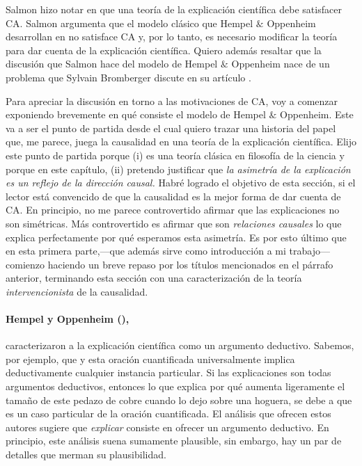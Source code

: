 Salmon hizo notar en  que una teoría
de la explicación científica debe satisfacer CA. Salmon
argumenta que el modelo clásico que Hempel $\&$ Oppenheim
desarrollan en  no satisface CA y, por
lo tanto, es necesario modificar la teoría para dar cuenta
de la explicación científica. Quiero además resaltar que la
discusión que Salmon hace del modelo de Hempel $\&$
Oppenheim nace de un problema que  Sylvain Bromberger
discute en su artículo .

Para apreciar la discusión en torno a las motivaciones de
CA, voy a comenzar exponiendo brevemente en qué consiste el
modelo de Hempel $\&$ Oppenheim. Este va a ser el punto de
partida desde el cual quiero trazar una historia del papel
que, me parece, juega la causalidad en una teoría de la
explicación científica. Elijo este punto de partida porque
(i) es una teoría clásica en filosofía de la ciencia y
porque en este capítulo, (ii) pretendo justificar que
\emph{la asimetría de la explicación es un reflejo de la
dirección causal.} Habré logrado el objetivo de esta
sección, si el lector está convencido de que la causalidad
es la mejor forma de dar cuenta de CA. 
En principio, no me parece controvertido afirmar que las
explicaciones no son simétricas. Más controvertido es
afirmar que son \emph{relaciones causales} lo que explica perfectamente
por qué esperamos esta asimetría. Es por esto último que
en esta primera parte,---que además sirve como introducción
a mi trabajo---comienzo haciendo un breve repaso por los
títulos mencionados en el párrafo anterior, terminando esta
sección con una caracterización de la teoría \emph{intervencionista} de
la causalidad.


\paragraph{Hempel y Oppenheim (\citeyear{Hempel1948}),}
caracterizaron  a la explicación científica como un
argumento deductivo. Sabemos, por ejemplo, que  y esta oración
cuantificada universalmente implica deductivamente cualquier
instancia particular. Si las explicaciones son todas
argumentos deductivos, entonces lo que explica por qué
aumenta ligeramente el tamaño de este pedazo de cobre cuando
lo dejo sobre una hoguera, se debe a que es un caso
particular de la oración cuantificada. El análisis que 
ofrecen estos autores sugiere que \emph{explicar} consiste 
en ofrecer un argumento deductivo. En principio, este análisis suena
sumamente plausible, sin embargo, hay un par de detalles que
merman su plausibilidad.


